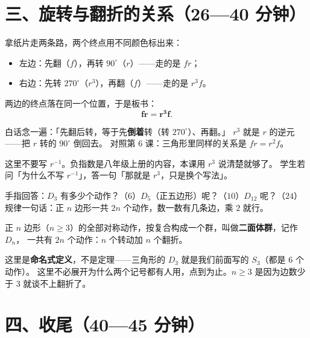 \section*{三、旋转与翻折的关系（26—40 分钟）}

\begin{caozuo}
  拿纸片走两条路，两个终点用不同颜色标出来：
  \begin{itemize}
    \item 左边：先翻（\(f\)），再转 \(90^\circ\)（\(r\)）——走的是 \(fr\)；
    \item 右边：先转 \(270^\circ\)（\(r^3\)），再翻（\(f\)）——走的是 \(r^3f\)。
  \end{itemize}
  两边的终点落在同一个位置，于是板书：
  \[
    \mathbf{fr=r^3f} .
  \]
\end{caozuo}

白话念一遍：「先翻后转，等于先\textbf{倒着}转（转 \(270^\circ\)）、再翻。」
\(r^3\) 就是 \(r\) 的逆元——把 \(r\) 转的 \(90^\circ\) 倒回去。
对照第 6 课：三角形里同样的关系是 \(fr=r^2f\)。

\begin{zhu}
  这里不要写 \(r^{-1}\)。负指数是八年级上册的内容，本课用 \(r^3\) 说清楚就够了。
  学生若问「为什么不写 \(r^{-1}\)」，答一句「那就是 \(r^3\)，只是换个写法」。
\end{zhu}

\begin{caozuo}
  手指回答：\(D_3\) 有多少个动作？（\(6\)）\(D_5\)（正五边形）呢？（\(10\)）\(D_{12}\) 呢？（\(24\)）
  规律一句话：正 \(n\) 边形一共 \(2n\) 个动作，数一数有几条边，乘 \(2\) 就行。
\end{caozuo}

\begin{definition}[二面体群]
  正 \(n\) 边形（\(n\ge 3\)）的全部对称动作，按复合构成一个群，叫做\textbf{二面体群}，记作 \(D_n\)，
  一共有 \(2n\) 个动作：\(n\) 个转动加 \(n\) 个翻折。
\end{definition}

\begin{zhu}
  这里是\textbf{命名式定义}，不是定理——三角形的 \(D_3\) 就是我们前面写的 \(S_3\)（都是 \(6\) 个动作）。
  这里不必展开为什么两个记号都有人用，点到为止。\(n\ge 3\) 是因为边数少于 \(3\) 就谈不上翻折了。
\end{zhu}

\section*{四、收尾（40—45 分钟）}

